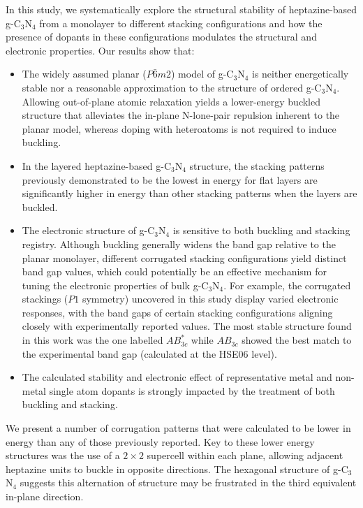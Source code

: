 In this study, we systematically explore the structural stability of heptazine-based g-C$_3$N$_4$ from a monolayer to different stacking configurations and how the presence of dopants in these configurations modulates the structural and electronic properties.
Our results show that: 
\begin{itemize}
    \item 
    The widely assumed planar ($P\bar{6}m2$) model of g-C$_3$N$_4$ is neither energetically stable nor a reasonable approximation to the structure of ordered g-C$_3$N$_4$. Allowing out-of-plane atomic relaxation yields a lower-energy buckled structure that alleviates the in-plane N-lone-pair repulsion inherent to the planar model, whereas doping with heteroatoms is not required to induce buckling.
    \item 
    In the layered heptazine-based g-C$_3$N$_4$ structure, the stacking patterns previously demonstrated to be the lowest in energy for flat layers are significantly higher in energy than other stacking patterns when the layers are buckled.
    \item 
    The electronic structure of g-C$_3$N$_4$ is sensitive to both buckling and stacking registry. Although buckling generally widens the band gap relative to the planar monolayer, different corrugated stacking configurations yield distinct band gap values, which could potentially be an effective mechanism for tuning the electronic properties of bulk g-C$_3$N$_4$. For example, the corrugated stackings ($P1$ symmetry) uncovered in this study display varied electronic responses, with the band gaps of certain stacking configurations aligning closely with experimentally reported values. The most stable structure found in this work was the one labelled $AB^*_{3c}$ while $AB_{3c}$ showed the best match to the experimental band gap (calculated at the HSE06 level).
    \item 
    The calculated stability and electronic effect of representative metal and non-metal single atom dopants is strongly impacted by the treatment of both buckling and stacking.
\end{itemize}

We present a number of corrugation patterns that were calculated to be 
lower in energy than any of those previously reported.  Key to these
lower energy structures was the use of a $2 \times 2$ supercell 
within each plane, allowing adjacent heptazine units to buckle in opposite directions.  The hexagonal structure of g-C$_3$N$_4$ suggests this 
alternation of structure may be frustrated in the third equivalent in-plane direction.

